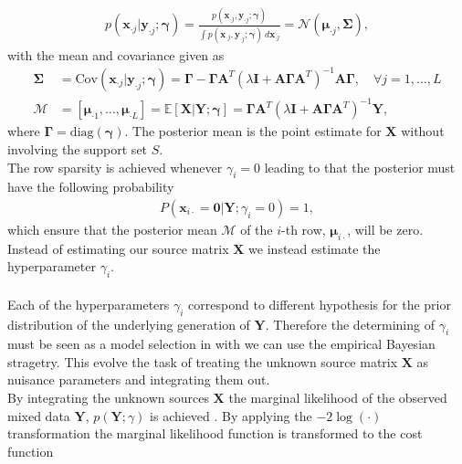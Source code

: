 \begin{align*}
p(\mathbf{x}_{\cdot j} \vert \mathbf{y}_{\cdot j} ; \boldsymbol{\gamma}) = \frac{p(\mathbf{x}_{\cdot j}, \mathbf{y}_{\cdot j} ; \boldsymbol{\gamma})}{\int p(\mathbf{x}_{\cdot j}, \mathbf{y}_{\cdot j} ; \boldsymbol{\gamma}) \ d \mathbf{x}_{\cdot j}} = \mathcal{N}(\boldsymbol{\mu}_{\cdot j}, \boldsymbol{\Sigma}),
\end{align*}
with the mean and covariance given as
\begin{align}\label{eq:moments}
\boldsymbol{\Sigma} &= \text{Cov}(\mathbf{x}_{\cdot j} \vert \mathbf{y}_{\cdot j} ; \boldsymbol{\gamma}) = \boldsymbol{\Gamma} - \boldsymbol{\Gamma} \mathbf{A}^T \left( \lambda \mathbf{I} + \mathbf{A} \boldsymbol{\Gamma} \mathbf{A}^T\right)^{-1} \mathbf{A} \boldsymbol{\Gamma}, \quad \forall j = 1, \dots, L \\
\mathcal{M} &= [\boldsymbol{\mu}_{\cdot 1}, \dots, \boldsymbol{\mu}_{\cdot L}] = \mathbb{E}[\mathbf{X} \vert \mathbf{Y} ; \boldsymbol{\gamma}] = \boldsymbol{\Gamma} \mathbf{A}^T \left( \lambda \mathbf{I} + \mathbf{A} \boldsymbol{\Gamma} \mathbf{A}^T\right)^{-1} \mathbf{Y},
\end{align}
where $\boldsymbol{\Gamma} = \text{diag}(\boldsymbol{\gamma})$. The posterior mean is the point estimate for $\mathbf{X}$ without involving the support set $S$.
\\
The row sparsity is achieved whenever $\gamma_i = 0$ leading to that the posterior must have the following probability
\begin{align*}
P(\mathbf{x}_{i \cdot} = \mathbf{0} \vert \mathbf{Y} ; \gamma_i = 0) = 1,
\end{align*}
which ensure that the posterior mean $\mathcal{M}$ of the $i$-th row, $\boldsymbol{\mu}_{i \cdot}$, will be zero. Instead of estimating our source matrix $\mathbf{X}$ we instead estimate the hyperparameter $\gamma_i$.
\\ \\
Each of the hyperparameters $\gamma_i$ correspond to different hypothesis for the prior distribution of the underlying generation of $\mathbf{Y}$. Therefore the determining of $\gamma_i$ must be seen as a model selection in with we can use the empirical Bayesian stragetry. This evolve the task of treating the unknown source matrix $\mathbf{X}$ as nuisance parameters and integrating them out.
\\
By integrating the unknown sources $\mathbf{X}$ the marginal likelihood of the observed mixed data $\mathbf{Y}$, $p (\mathbf{Y} ; \gamma)$ is achieved \cite[p. 146]{??}. By applying the $-2 \log (\cdot)$ transformation the marginal likelihood function is transformed to the cost function
